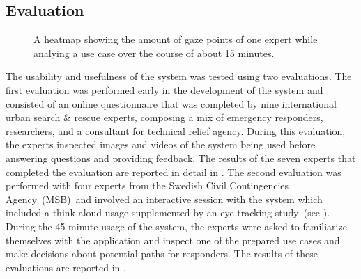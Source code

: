 \subsection{Evaluation} \label{contributions:usar:evaluation}
\begin{figure}
\caption{A heatmap showing the amount of gaze points of one expert while analying a use case over the course of about 15 minutes.}
\label{contributions:usar:system:heatmap}
\end{figure}

The usability and usefulness of the system was tested using two evaluations.  The first evaluation was performed early in the development of the system and consisted of an online questionnaire that was completed by nine international urban search \& rescue experts, composing a mix of emergency responders, researchers, and a consultant for technical relief agency.  During this evaluation, the experts inspected images and videos of the system being used before answering questions and providing feedback.  The results of the seven experts that completed the evaluation are reported in detail in .  The second evaluation was performed with four experts from the Swedish Civil Contingencies Agency~(MSB)~and involved an interactive session with the system which included a think-aloud usage supplemented by an eye-tracking study~(see ).  During the 45 minute usage of the system, the experts were asked to familiarize themselves with the application and inspect one of the prepared use cases and make decisions about potential paths for responders.  The results of these evaluations are reported in .





